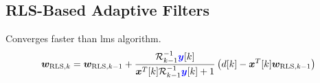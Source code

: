 \subsection{RLS-Based Adaptive Filters}
Converges faster than lms algorithm.
\begin{equation}
\boldsymbol{w}_{\mathrm{RLS}, k}=\boldsymbol{w}_{\mathrm{RLS}, k-1}+\frac{\mathcal{R}_{k-1}^{-1} \textcolor{blue}{\boldsymbol{y}}[k]}{\boldsymbol{x}^T[k] \mathcal{R}_{k-1}^{-1} \textcolor{blue}{\boldsymbol{y}}[k]+1}\left(d[k]-\boldsymbol{x}^T[k] \boldsymbol{w}_{\mathrm{RLS}, k-1}\right)
\end{equation}